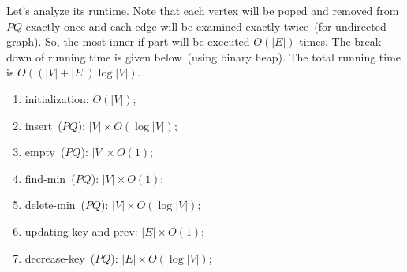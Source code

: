 \begin{algorithmblock}[0.8\textwidth]
	\xxx
	\xxx
	\xxx
	\xxx
	\xxx
	\xxx
	\xxx
	\xxx
	\xxx
	\xxx
	\xxx
	\xxx
	\xxx
	\xxx
	\xxx
	\xxx
	\xxx
\end{algorithmblock}


Let's analyze its runtime.
Note that each vertex will be poped and removed 
from $PQ$ exactly once and each edge will be examined exactly twice~(for undirected graph).
So, the most inner {if} part will be executed $O(|E|)$ times.
The break-down of running time is given below~(using binary heap).
The total running time is $O((|V|+|E|)\log |V|)$.

\begin{enumerate}
\item initialization: $\Theta(|V|)$;
\item insert~($PQ$): $|V| \times O(\log |V|)$;
\item empty~($PQ$): $|V| \times O(1)$;
\item find-min~($PQ$): $|V| \times O(1)$;
\item delete-min~($PQ$): $|V| \times O(\log |V|)$;
\item updating key and prev: $|E| \times O(1)$;
\item decrease-key~($PQ$): $|E| \times O(\log |V|)$;
\end{enumerate}

